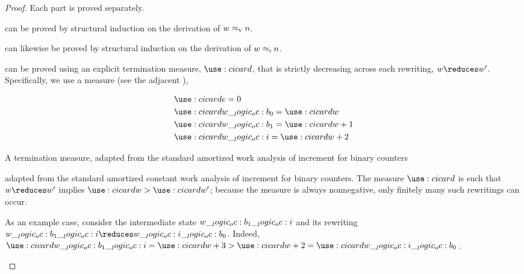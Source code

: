 \begin{proof}
  Each part is proved separately.
  \begin{description}[
    parsep=0pt, listparindent=\parindent,
    labelsep=0.35em
  ]
  \item[Value soundness]
    can be proved by structural induction on the derivation of $w \approx\sb{\text{\normalfont\scshape v}} n$.
  \item[Preservation and progress]
    can likewise be proved by structural induction on the derivation of $w \approx\sb{\text{\normalfont\scshape i}} n$.
  \item[Termination]
    can be proved using an explicit termination measure, $\card[i]{}$, that is strictly decreasing across each rewriting, $w \reduces w'$.
    Specifically, we use a measure (see the adjacent ),
    \begin{marginfigure}
      \begin{equation*}
        \begin{lgathered}
          \card[i]{e} = 0 \\
          \card[i]{w \oc b_0} = \card[i]{w} \\
          \card[i]{w \oc b_1} = \card[i]{w} + 1 \\
          \card[i]{w \oc i} = \card[i]{w} + 2
        \end{lgathered}
      \end{equation*}
      \caption{A termination measure, adapted from the standard amortized work analysis of increment for binary counters}\label{fig:string-rewriting:binary-counter:measure}
    \end{marginfigure}%
    adapted from the standard amortized constant work analysis of increment for binary counters\autocite{Cormen+:MIT09}.
    The measure $\card[i]{}$ is such that $w \reduces w'$ implies $\card[i]{w} > \card[i]{w'}$;
    because the measure is always nonnegative, only finitely many such rewritings can occur.

    As an example case, consider the intermediate state $w \__logic_oc: b_1 \__logic_oc: i$ and its rewriting $w \oc b_1 \oc i \reduces w \oc i \oc b_0$.
    Indeed, $\card[i]{w \oc b_1 \oc i} = \card[i]{w} + 3 > \card[i]{w} + 2 = \card[i]{w \oc i \oc b_0}$.
  \qedhere
  \end{description}
\end{proof}

